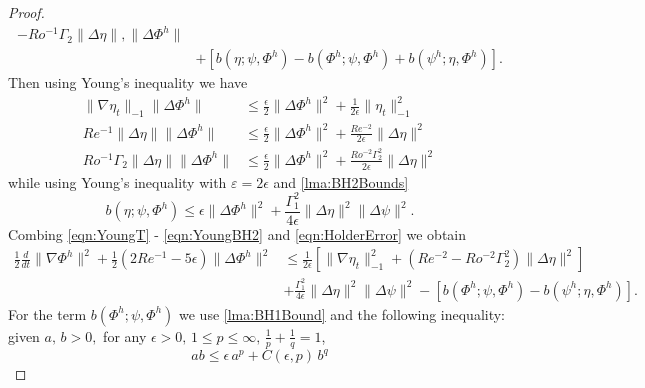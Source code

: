 \begin{proof}
\begin{equation}
\begin{split}
        - Ro^{-1} \Gamma_2 \|\Delta \eta\|, \|\Delta \Phi^h\| \\
      & + \left[ b(\eta;\psi,\Phi^h) - b(\Phi^h;\psi,\Phi^h)
        + b(\psi^h;\eta,\Phi^h)\right].
    \end{split}
    \label{eqn:HolderError}
  \end{equation}
  Then using Young's inequality we have
  \begin{align}
    \|\nabla \eta_t\|_{-1} \|\Delta \Phi^h\|
      &\le \frac{\epsilon}{2} \|\Delta \Phi^h\|^2
      + \frac{1}{2 \epsilon} \|\eta_t\|_{-1}^2 \label{eqn:YoungT} \\
    Re^{-1} \|\Delta \eta\| \|\Delta \Phi^h\|
      &\le \frac{\epsilon}{2} \|\Delta \Phi^h\|^2
      + \frac{Re^{-2}}{2 \epsilon} \|\Delta \eta\|^2 \label{eqn:YoungLaplace} \\
    Ro^{-1} \Gamma_2 \|\Delta \eta\| \|\Delta \Phi^h\|
      &\le \frac{\epsilon}{2} \|\Delta \Phi^h\|^2
      + \frac{Ro^{-2} \Gamma_2^2}{2 \epsilon} \|\Delta \eta\|^2 \label{eqn:YoungBeta}
  \end{align}
  while using Young's inequality with $\varepsilon = 2 \epsilon$ and
  \autoref{lma:BH2Bounds}
  \begin{equation}
    b(\eta;\psi,\Phi^h)
      \le \epsilon \|\Delta \Phi^h\|^2
      + \frac{\Gamma_1^2}{4 \epsilon} \|\Delta \eta\|^2 \|\Delta \psi\|^2.
      \label{eqn:YoungBH2}
  \end{equation}
  Combing \eqref{eqn:YoungT} - \eqref{eqn:YoungBH2} and \eqref{eqn:HolderError}
  we obtain
  \begin{equation}
    \begin{split}
    \frac{1}{2} \frac{d}{dt} \|\nabla \Phi^h\|^2 + \frac{1}{2}\left(2Re^{-1} -
      5 \epsilon \right)\|\Delta \Phi^h\|^2
      &\le \frac{1}{2 \epsilon}\left[\|\nabla \eta_t\|_{-1}^2
      + \left( Re^{-2} - Ro^{-2} \Gamma_2^2 \right) \|\Delta \eta\|^2\right] \\
     & + \frac{\Gamma_1^2}{4 \epsilon}\|\Delta \eta\|^2 \|\Delta \psi\|^2  -
     \left[b(\Phi^h;\psi,\Phi^h) - b(\psi^h;\eta,\Phi^h)\right].
    \end{split}
    \label{eqn:B1Inequality}
  \end{equation}
  For the term $b(\Phi^h; \psi, \Phi^h)$ we use \autoref{lma:BH1Bound} and the
  following inequality: given $a,\,b>0,$ for any $\epsilon > 0,\, 1\le p \le
  \infty,\, \frac{1}{p} + \frac{1}{q} = 1$,
  \begin{equation*}
    ab \le \epsilon\, a^p + C(\epsilon,p)\, b^q
  \end{equation*}

\end{proof}
